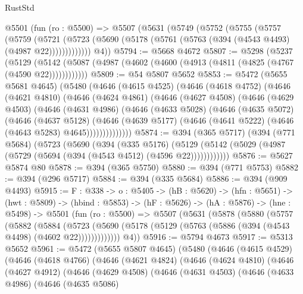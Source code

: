 \begin{lexlean}{RustStd}
\begin{coremodule}
  @5501
    (fun (ro : @5500) =>
    @5507
      (@5631
        (@5749
          (@5752
            (@5755
              (@5757
                (@5759
                  (@5721
                    (@5723 (@5690 (@5178 (@5761 (@5763 (@394 (@4543 @4493) (@4987 @22)))))))))))))
        @4))
@5794 := @5668 @4672
@5807 := @5298
    (@5237
      (@5129 (@5142 (@5087 (@4987 (@4602 (@4600 (@4913 (@4811 (@4825 (@4767 (@4590 @22))))))))))))
@5809 := @54 @5807 @5652
@5853 := @5472
    (@5655 @5681 @4645)
    (@5480
      (@4646
        (@4615 @4525)
        (@4646
          (@4618 @4752)
          (@4646
            (@4621 @4810)
            (@4646
              (@4624 @4861)
              (@4646
                (@4627 @4508)
                (@4646
                  (@4629 @4503)
                  (@4646
                    (@4631 @4986)
                    (@4646
                      (@4633 @5028)
                      (@4646
                        (@4635 @5072)
                        (@4646
                          (@4637 @5128)
                          (@4646
                            (@4639 @5177)
                            (@4646 (@4641 @5222) (@4646 (@4643 @5283) @4645))))))))))))))
@5874 := @394
    (@365 @5717)
    (@394
      (@771 @5684)
      (@5723
        (@5690
          (@394
            (@335 @5176)
            (@5129 (@5142 (@5029 (@4987 (@5729 (@5694 (@394 (@4543 @4512) (@4596 @22))))))))))))
@5876 := @5627 @5874 @80
@5878 := @394 (@365 @5750)
@5880 := @394 (@771 @5753)
@5882 := @394 (@296 @5717)
@5884 := @394 (@335 @5684)
@5886 := @394 (@909 @4493)
@5915 := {F : @338} ->
  {o : @5405} ->
  (hB : @5620) ->
  (hfn : @5651) ->
  (hwt : @5809) ->
  (hbind : @5853) ->
  (hF : @5626) ->
  (hA : @5876) ->
  (hne : @5498) ->
  @5501
    (fun (ro : @5500) =>
    @5507
      (@5631
        (@5878
          (@5880
            (@5757
              (@5882
                (@5884
                  (@5723
                    (@5690 (@5178 (@5129 (@5763 (@5886 (@394 (@4543 @4498) (@4602 @22)))))))))))))
        @4))
@5916 := @5794 @4673
@5917 := @5313 @5652
@5961 := @5472
    (@5655 @5807 @4645)
    (@5480
      (@4646
        (@4615 @4529)
        (@4646
          (@4618 @4766)
          (@4646
            (@4621 @4824)
            (@4646
              (@4624 @4810)
              (@4646
                (@4627 @4912)
                (@4646
                  (@4629 @4508)
                  (@4646
                    (@4631 @4503)
                    (@4646
                      (@4633 @4986)
                      (@4646
                        (@4635 @5086)

\end{coremodule}
\end{lexlean}
